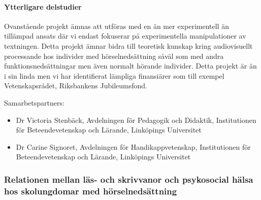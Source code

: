 \documentclass[]{article}
\providecommand{\tightlist}{%
  \setlength{\itemsep}{0pt}\setlength{\parskip}{0pt}}
\begin{document}
\hypertarget{ytterligare-delstudier}{%
\paragraph{Ytterligare delstudier}\label{ytterligare-delstudier}}

Ovanstående projekt ämnas att utföras med en än mer experimentell än
tillämpad ansats där vi endast fokuserar på experimentella
manipulationer av textningen. Detta projekt ämnar bidra till teoretisk
kunskap kring audiovisuellt processande hos individer med
hörselnedsättning såväl som med andra funktionsnedsättningar men även
normalt hörande individer. Detta projekt är än i sin linda men vi har
identifierat lämpliga finansiärer som till exempel Vetenskapsrådet,
Riksbankens Jubileumsfond.

Samarbetspartners:

\begin{itemize}
\tightlist
\item
  Dr Victoria Stenbäck, Avdelningen för Pedagogik och Didaktik,
  Institutionen för Beteendevetenskap och Lärande, Linköpings
  Universitet
\item
  Dr Carine Signoret, Avdelningen för Handikappvetenskap, Institutionen
  för Beteendevetenskap och Lärande, Linköpings Universitet
\end{itemize}

\hypertarget{relationen-mellan-luxe4s--och-skrivvanor-och-psykosocial-huxe4lsa-hos-skolungdomar-med-huxf6rselnedsuxe4ttning}{%
\subsubsection{Relationen mellan läs- och skrivvanor och psykosocial
hälsa hos skolungdomar med
hörselnedsättning}\label{relationen-mellan-luxe4s--och-skrivvanor-och-psykosocial-huxe4lsa-hos-skolungdomar-med-huxf6rselnedsuxe4ttning}}
\end{document}
